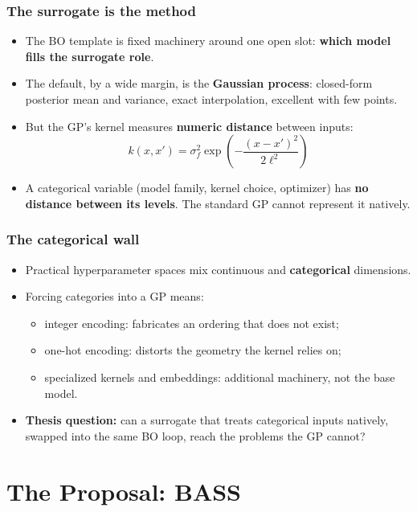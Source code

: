 \documentclass[fleqn]{beamer}
\begin{document}
\begin{frame}
  \frametitle{The surrogate is the method}
  \begin{itemize}
    \item The BO template is fixed machinery around one open slot: \textbf{which model fills the surrogate role}.
    \item The default, by a wide margin, is the \textbf{Gaussian process}: closed-form posterior mean and variance, exact interpolation, excellent with few points.
    \item But the GP's kernel measures \textbf{numeric distance} between inputs:
    \[ k(x, x') = \sigma_f^2 \exp\left( -\frac{(x - x')^2}{2\ell^2} \right) \]
    \item A categorical variable (model family, kernel choice, optimizer) has \textbf{no distance between its levels}. The standard GP cannot represent it natively.
  \end{itemize}
\end{frame}

\begin{frame}
  \frametitle{The categorical wall}
  \begin{itemize}
    \item Practical hyperparameter spaces mix continuous and \textbf{categorical} dimensions.
    \item Forcing categories into a GP means:
    \begin{itemize}
      \item integer encoding: fabricates an ordering that does not exist;
      \item one-hot encoding: distorts the geometry the kernel relies on;
      \item specialized kernels and embeddings: additional machinery, not the base model.
    \end{itemize}
    \item \textbf{Thesis question:} can a surrogate that treats categorical inputs natively, swapped into the same BO loop, reach the problems the GP cannot?
  \end{itemize}
\end{frame}

\section{The Proposal: BASS}
\end{document}
